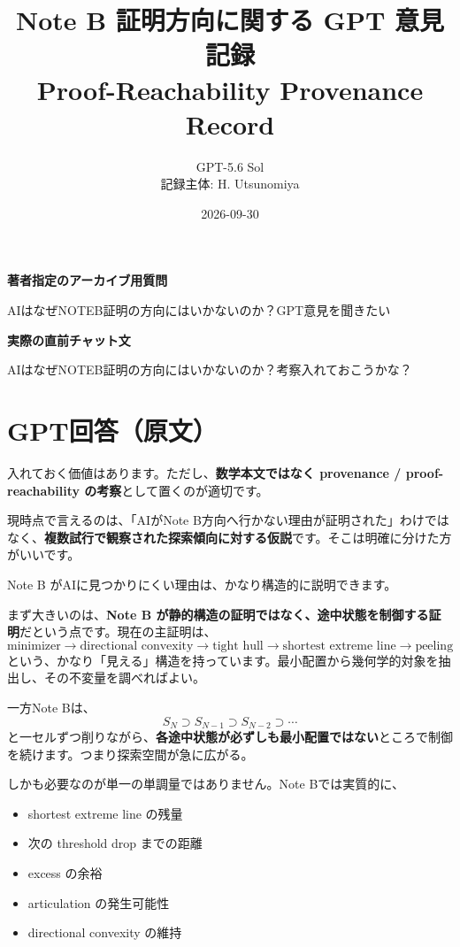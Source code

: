 \documentclass[11pt,a4paper]{article}
\title{\bfseries Note B 証明方向に関する GPT 意見記録\\[4pt]
\large Proof-Reachability Provenance Record}
\author{GPT-5.6 Sol\\記録主体: H. Utsunomiya}
\date{2026-09-30}
\newcommand{\recordlabel}[1]{\par\noindent\textsf{\bfseries #1}\par}
\begin{document}
\maketitle

\begin{center}
\end{center}

\recordlabel{著者指定のアーカイブ用質問}
AIはなぜNOTEB証明の方向にはいかないのか？GPT意見を聞きたい

\recordlabel{実際の直前チャット文}
AIはなぜNOTEB証明の方向にはいかないのか？考察入れておこうかな？

\section*{GPT回答（原文）}

入れておく価値はあります。ただし、\textbf{数学本文ではなく provenance / proof-reachability の考察}として置くのが適切です。

現時点で言えるのは、「AIがNote B方向へ行かない理由が証明された」わけではなく、\textbf{複数試行で観察された探索傾向に対する仮説}です。そこは明確に分けた方がいいです。

Note B がAIに見つかりにくい理由は、かなり構造的に説明できます。

まず大きいのは、\textbf{Note B が静的構造の証明ではなく、途中状態を制御する証明}だという点です。現在の主証明は、
\[
\text{minimizer}
\to
\text{directional convexity}
\to
\text{tight hull}
\to
\text{shortest extreme line}
\to
\text{peeling}
\]
という、かなり「見える」構造を持っています。最小配置から幾何学的対象を抽出し、その不変量を調べればよい。

一方Note Bは、
\[
S_N\supset S_{N-1}\supset S_{N-2}\supset\cdots
\]
と一セルずつ削りながら、\textbf{各途中状態が必ずしも最小配置ではない}ところで制御を続けます。つまり探索空間が急に広がる。

しかも必要なのが単一の単調量ではありません。Note Bでは実質的に、

\begin{itemize}[leftmargin=2em]
\item shortest extreme line の残量
\item 次の threshold drop までの距離
\item excess の余裕
\item articulation の発生可能性
\item directional convexity の維持
\end{itemize}
\end{document}
